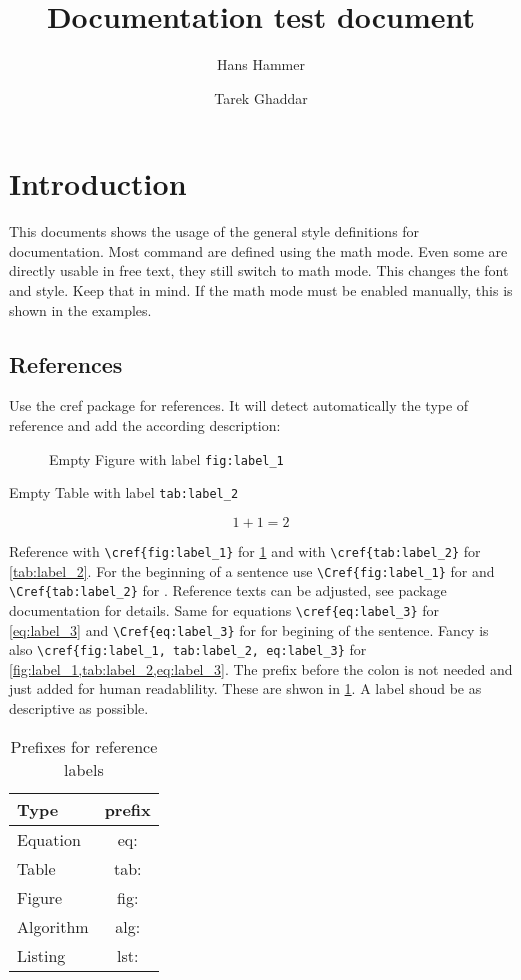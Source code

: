 \documentclass[10pt,letterpaper,oneside]{article}
\title{Documentation test document}
\author[1]{Hans Hammer}
\author[1]{Tarek Ghaddar}
\affil[1]{Texas A\&M University - Department of Nuclear Engineering}
\begin{document}
\maketitle

\tableofcontents

\section{Introduction}
This documents shows the usage of the general style definitions for documentation. Most command are defined using the math mode. Even some are directly usable in free text, they still switch to math mode. This changes the font and style. Keep that in mind.
If the math mode must be enabled manually, this is shown in the examples.

\subsection{References}
Use the cref package for references. It will detect automatically the type of reference and add the according description:

\begin{figure}[H]
  \caption{Empty Figure with label \texttt{fig:label\_1}}
  \label{fig:label_1}
\end{figure}

\begin{table}[H]
  \caption{Empty Table with label \texttt{tab:label\_2}}
  \label{tab:label_2}
\end{table}

\begin{equation} \label{eq:label_3}
  1 + 1 = 2
\end{equation}

Reference with \lstinline|\cref{fig:label_1}| for \cref{fig:label_1} and with  \lstinline|\cref{tab:label_2}| for \cref{tab:label_2}. For the beginning of a sentence use \lstinline|\Cref{fig:label_1}| for  and \lstinline|\Cref{tab:label_2}| for . Reference texts can be adjusted, see package documentation for details.
Same for equations \lstinline|\cref{eq:label_3}| for \cref{eq:label_3} and \lstinline|\Cref{eq:label_3}| for  for begining of the sentence.
Fancy is also \lstinline|\cref{fig:label_1, tab:label_2, eq:label_3}| for \cref{fig:label_1,tab:label_2,eq:label_3}.
The prefix before the colon is not needed and just added for human readablility. These are shwon in \cref{tab:label_prefixes}. A label shoud be as descriptive as possible.
\begin{table}
  \caption{Prefixes for reference labels}
  \begin{tabular}{l|c}
    Type & prefix \\ \hline
    Equation & eq: \\
    Table & tab: \\
    Figure & fig: \\
    Algorithm & alg: \\
    Listing & lst: \\
  \end{tabular}
  \label{tab:label_prefixes}
\end{table}
\end{document}
